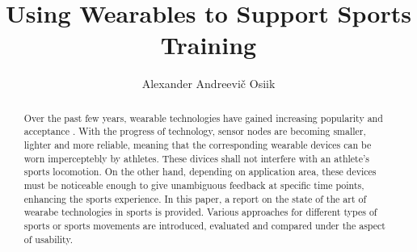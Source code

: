 \documentclass[sigconf]{acmart}
\begin{document}
	
	\title{Using Wearables to Support Sports Training}
	
	\author{Alexander Andreevi\v{c} Osiik}
	
	\renewcommand{\shortauthors}{A.A. Osiik}
	
	\begin{abstract}
		Over the past few years, wearable technologies have gained increasing popularity and acceptance \cite{Trend}. With the progress of technology, sensor nodes are becoming smaller, lighter and more reliable, meaning that the corresponding wearable devices can be worn imperceptebly by athletes. These divices shall not interfere with an athlete's sports locomotion. On the other hand, depending on application area, these devices must be noticeable enough to give unambiguous feedback at specific time points, enhancing the sports experience.
		In this paper, a report on the state of the art of wearabe technologies in sports is provided. Various approaches for different types of sports or sports movements are introduced, evaluated and compared under the aspect of usability.
	\end{abstract}
	
\end{document}
